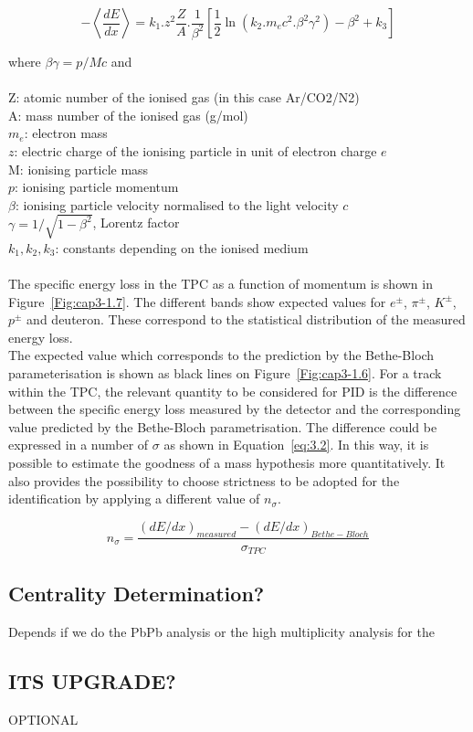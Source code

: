 \begin{equation}
\label{eq:3.1}
-\left< \frac{dE}{dx} \right> = k_{1}. z^{2}\frac{Z}{A}. \frac{1}{\beta^{2}}\left[ \frac{1}{2}\ln(k_{2}.m_{e}c^{2}.\beta^{2}\gamma^{2}) - \beta^{2} + k_{3} \right]
\end{equation}

where $\beta\gamma = p/Mc $ and 
\\
\\
Z: atomic number of the ionised gas (in this case Ar/CO2/N2)\\
A: mass number of the ionised gas (g/mol)\\
$m_{e}$: electron mass\\
$z$: electric charge of the ionising particle in unit of electron charge $e$\\
M: ionising particle mass\\
$p$: ionising particle momentum\\
$\beta$: ionising particle velocity normalised to the light velocity $c$\\
$\gamma = 1/\sqrt{1-\beta^{2}}$, Lorentz factor\\
$k_{1}, k_{2}, k_{3}$: constants depending on the ionised medium\\
\\
The specific energy loss in the TPC as a function of momentum is shown in \mbox{Figure \ref{Fig:cap3-1.7}}. The different bands show expected values for $e^{\pm}$, $\pi^{\pm}$, $K^{\pm}$, $p^{\pm}$ and deuteron. These correspond to the statistical distribution of the measured energy loss.\\
The expected value which corresponds to the prediction by the Bethe-Bloch parameterisation is shown as black lines on \mbox{Figure \ref{Fig:cap3-1.6}}. For a track within the TPC, the relevant quantity to be considered for PID is the difference between the specific energy loss measured by the detector and the corresponding value predicted by the Bethe-Bloch parametrisation. The difference could be expressed in a number of $\sigma$ as shown in \mbox{Equation \ref{eq:3.2}}. In this way, it is possible to estimate the goodness of a mass hypothesis more quantitatively. It also provides the possibility to choose strictness to be adopted for the identification by applying a different value of $n_{\sigma}$.

\begin{equation}
\label{eq:3.2}
n_{\sigma} = \frac{(dE/dx)_{measured} -  (dE/dx)_{Bethe-Bloch} }{\sigma_{TPC}}
\end{equation}




\subsection{Centrality Determination?}
\label{par:3.2g}
Depends if we do the PbPb analysis or the high multiplicity analysis for the \simplekstarch


\subsection{ITS UPGRADE?}
\label{par:3.2g}
OPTIONAL

















